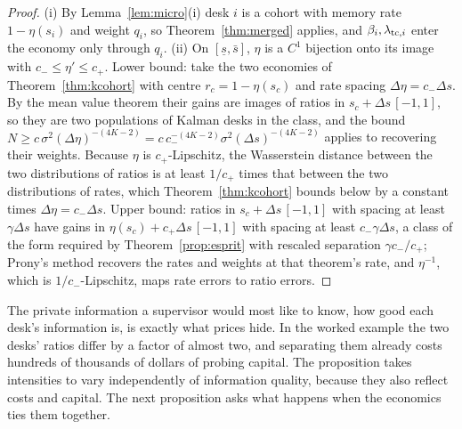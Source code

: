 \documentclass[12pt]{article}
\theoremstyle{definition}
\theoremstyle{remark}
\begin{document}
\begin{proof}
(i) By Lemma~\ref{lem:micro}(i) desk $i$ is a cohort with memory rate $1-\eta(s_i)$ and weight $q_i$, so Theorem~\ref{thm:merged} applies, and $\beta_i,\lambda_{{\rm tc},i}$ enter the economy only through $q_i$. (ii) On $[\underline s,\bar s]$, $\eta$ is a $C^1$ bijection onto its image with $c_-\le\eta'\le c_+$. Lower bound: take the two economies of Theorem~\ref{thm:kcohort} with centre $r_c=1-\eta(s_c)$ and rate spacing $\Delta\eta=c_-\Delta s$. By the mean value theorem their gains are images of ratios in $s_c+\Delta s\,[-1,1]$, so they are two populations of Kalman desks in the class, and the bound $N\ge c\,\sigma^2(\Delta\eta)^{-(4K-2)}=c\,c_-^{-(4K-2)}\sigma^2(\Delta s)^{-(4K-2)}$ applies to recovering their weights. Because $\eta$ is $c_+$-Lipschitz, the Wasserstein distance between the two distributions of ratios is at least $1/c_+$ times that between the two distributions of rates, which Theorem~\ref{thm:kcohort} bounds below by a constant times $\Delta\eta=c_-\Delta s$. Upper bound: ratios in $s_c+\Delta s\,[-1,1]$ with spacing at least $\gamma\Delta s$ have gains in $\eta(s_c)+c_+\Delta s\,[-1,1]$ with spacing at least $c_-\gamma\Delta s$, a class of the form required by Theorem~\ref{prop:esprit} with rescaled separation $\gamma c_-/c_+$; Prony's method recovers the rates and weights at that theorem's rate, and $\eta^{-1}$, which is $1/c_-$-Lipschitz, maps rate errors to ratio errors.
\end{proof}

The private information a supervisor would most like to know, how good each desk's information is, is exactly what prices hide. In the worked example the two desks' ratios differ by a factor of almost two, and separating them already costs hundreds of thousands of dollars of probing capital. The proposition takes intensities to vary independently of information quality, because they also reflect costs and capital. The next proposition asks what happens when the economics ties them together.
\end{document}
